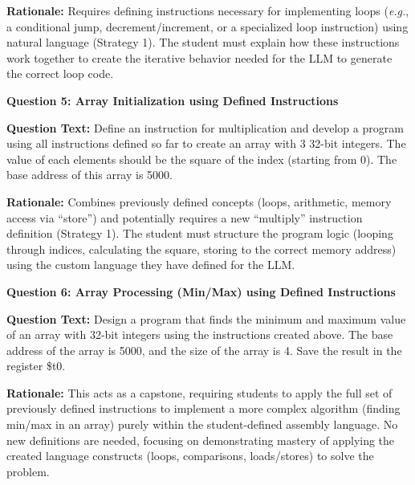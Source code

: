 \documentclass{article} %
\begin{document}
\textbf{Rationale:} Requires defining instructions necessary for implementing loops ({\em e.g.}, a conditional jump, decrement/increment, or a specialized loop instruction) using natural language (Strategy 1). The student must explain how these instructions work together to create the iterative behavior needed for the LLM to generate the correct loop code.

\textbf{Question 5: Array Initialization using Defined Instructions}

\textbf{Question Text:} Define an instruction for multiplication and develop a program using all instructions defined so far to create an array with 3 32-bit integers. The value of each elements should be the square of the index (starting from 0). The base address of this array is 5000.

\textbf{Rationale:} Combines previously defined concepts (loops, arithmetic, memory access via ``store'') and potentially requires a new ``multiply'' instruction definition (Strategy 1). The student must structure the program logic (looping through indices, calculating the square, storing to the correct memory address) using the custom language they have defined for the LLM.

\textbf{Question 6: Array Processing (Min/Max) using Defined Instructions}

\textbf{Question Text:} Design a program that finds the minimum and maximum value of an array with 32-bit integers using the instructions created above. The base address of the array is 5000, and the size of the array is 4. Save the result in the register \$t0.

\textbf{Rationale:} This acts as a capstone, requiring students to apply the full set of previously defined instructions to implement a more complex algorithm (finding min/max in an array) purely within the student-defined assembly language. No new definitions are needed, focusing on demonstrating mastery of applying the created language constructs (loops, comparisons, loads/stores) to solve the problem.
\end{document}
